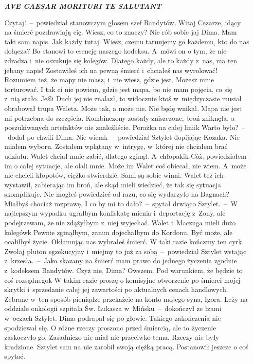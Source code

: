 \documentclass[../MAIN.tex]{subfiles}
\begin{document}
\centerline{\bf\em AVE CAESAR MORITURI TE
SALUTANT}
\sx
Czytaj!~--~powiedział stanowczym głosem szef Bandytów.
\xx Witaj Cezarze, idący na śmierć pozdrawiają cię.
\xx Wiesz, co to znaczy?
\xx Nie rób sobie jaj Dima. Mam taki sam napis. Jak każdy tutaj.
\xx Wiesz, czemu tatuujemy go każdemu, kto do nas dołącza? Bo stanowi to esencję naszego kodeksu. A~mówi on o tym, że nie zdradza i~nie oszukuje się kolegów. Dlatego każdy, ale to każdy z~nas, ma ten jebany napis! Zostawiłeś ich na pewną śmierć i~chciałeś nas wyrolować! Rozumiem też, że mapy nie masz, i~nie wiesz, gdzie jest.
\xx Możesz mnie torturować. I tak ci nie powiem, gdzie jest mapa, bo nie mam pojęcia, co się z~nią stało. Jeśli Duch jej nie znalazł, to widocznie ktoś w~międzyczasie musiał obrabował trupa Waleta.
\xx Może tak, a może nie. Nie będę wnikał. Mapa nie jest mi potrzebna do szczęścia. Kombinezony zostały zniszczone, broń zniknęła, a poszukiwanych artefaktów nie znaleźliście. Porażka na całej linii\3k Warto było?~--~dodał po chwili Dima.
\xx Nie wiem\3k~--~powiedział Sztylet dopijając Kozaka. \xx Nie miałem wyboru. Zostałem wplątany w~intrygę, w~której nie chciałem brać udziału. Walet chciał mnie zabić, dlatego zginął. A~chłopaki\3k Cóż, powiedziałem im o całej sytuacje, ale olali mnie. Może im Walet coś obiecał, nie wiem. A~może nie chcieli kłopotów, ciężko stwierdzić. Sami są sobie winni. Walet też ich wystawił, zabierając im broń, ale skąd mieli wiedzieć, że tak się sytuacja skomplikuje.
\xx Nie mogłeś powiedzieć od razu, co się wydarzyło na Bagnach? Miałbyś chociaż rozprawę.
\xx I co by mi to dało?~--~spytał drwiąco Sztylet.~--~W najlepszym wypadku ugrałbym konfiskatę mienia i~deportację z~Zony, ale podejrzewam, że nie zdążyłbym z~niej wyjechać. Walet i~Maczuga mieli dużo kolegów\3k Pewnie zginąłbym, zanim dojechałbym do Kordonu.
\xx Być może, ale ocaliłbyś życie. Okłamując nas wybrałeś śmierć.
\xx W taki razie kończmy ten cyrk. Zwołaj pluton egzekucyjny i~miejmy to już za sobą~--~powiedział Sztylet wstając z~krzesła.~--~Jako skazany na śmierć mam prawo do jednego życzenia zgodnie z~kodeksem Bandytów. Czyż nie, Dima?
\xx Owszem. Pod warunkiem, że będzie to coś rozsądnego\3k
\xx W takim razie proszę o komisyjne otworzenie po śmierci mojej skrytki i~sprzedanie całej jej zawartości po aktualnych cenach handlowych. Zebrane w~ten sposób pieniądze przekażcie na konto mojego syna, Igora. Leży na oddziale onkologii szpitala Św. Łukasza w~Mińsku~--~dokończył ze łzami w~oczach Sztylet.
\qm
Dima podrapał się po głowie. Takiego zakończenia nie spodziewał się. O różne rzeczy proszono przed śmiercią, ale to życzenie zaskoczyło go. Zasadniczo nie miał nic przeciwko temu. Rzeczy nie były kradzione. Sztylet sam na nie zarobił swoją ciężką pracą. Postanowił jeszcze o coś spytać.
\end{document}
